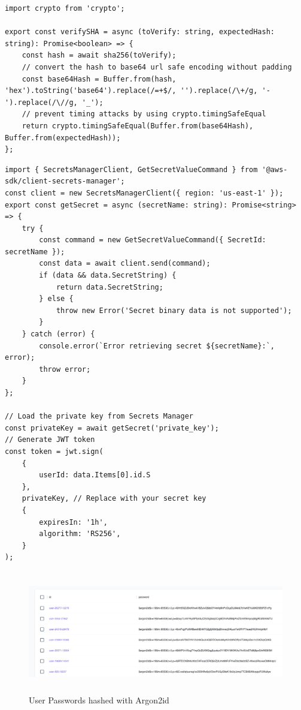 \begin{lstlisting}[style=typescript,caption=Code Challenge Timing safe comparisons,label=apendix:timing_safe_comparions]
import crypto from 'crypto';

export const verifySHA = async (toVerify: string, expectedHash: string): Promise<boolean> => {
    const hash = await sha256(toVerify);
    // convert the hash to base64 url safe encoding without padding
    const base64Hash = Buffer.from(hash, 'hex').toString('base64').replace(/=+$/, '').replace(/\+/g, '-').replace(/\//g, '_');
    // prevent timing attacks by using crypto.timingSafeEqual
    return crypto.timingSafeEqual(Buffer.from(base64Hash), Buffer.from(expectedHash));
};
\end{lstlisting}

\newpage

\begin{lstlisting}[style=typescript,caption=Token Signature using Assymetric key with RS256 stored in Secrets Manager,label=apendix:token_signing]
import { SecretsManagerClient, GetSecretValueCommand } from '@aws-sdk/client-secrets-manager';
const client = new SecretsManagerClient({ region: 'us-east-1' });
export const getSecret = async (secretName: string): Promise<string> => {
    try {
        const command = new GetSecretValueCommand({ SecretId: secretName });
        const data = await client.send(command);
        if (data && data.SecretString) {
            return data.SecretString;
        } else {
            throw new Error('Secret binary data is not supported');
        }
    } catch (error) {
        console.error(`Error retrieving secret ${secretName}:`, error);
        throw error;
    }
};

// Load the private key from Secrets Manager
const privateKey = await getSecret('private_key');
// Generate JWT token
const token = jwt.sign(
    {
        userId: data.Items[0].id.S
    },
    privateKey, // Replace with your secret key
    {
        expiresIn: '1h',
        algorithm: 'RS256',
    }
);

\end{lstlisting}

\begin{figure}[h!]
\label{fig:argon2id_hash}
\centering
\includegraphics[width=\textwidth, height=200px]{pics/argon2id.png}
\caption{User Passwords hashed with Argon2id}
\end{figure}

